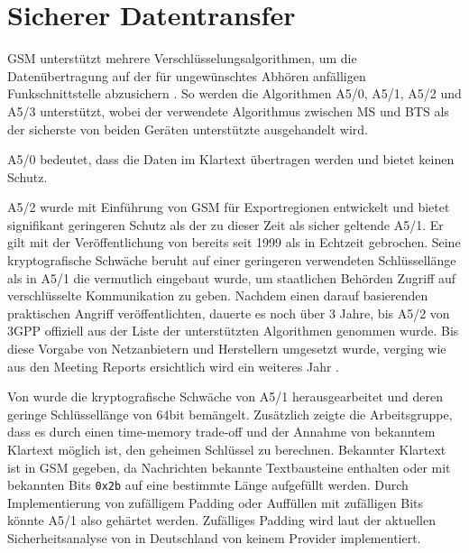 \section{Sicherer Datentransfer}

\ac{GSM} unterstützt mehrere Verschlüsselungsalgorithmen, um die Datenübertragung auf der für ungewünschtes Abhören anfälligen Funkschnittstelle abzusichern . So werden die Algorithmen A5/0, A5/1, A5/2 und A5/3 unterstützt, wobei der verwendete Algorithmus zwischen \ac{MS} und \ac{BTS} als der sicherste von beiden Geräten unterstützte ausgehandelt wird. 

A5/0 bedeutet, dass die Daten im Klartext übertragen werden und bietet keinen Schutz. 

A5/2 wurde mit Einführung von GSM für Exportregionen entwickelt und bietet signifikant geringeren Schutz als der zu dieser Zeit als sicher geltende A5/1. Er gilt mit der Veröffentlichung von \citet{goldberg1999real} bereits seit 1999 als in Echtzeit gebrochen. Seine kryptografische Schwäche beruht auf einer geringeren verwendeten Schlüssellänge als in A5/1 die vermutlich eingebaut wurde, um staatlichen Behörden Zugriff auf verschlüsselte Kommunikation zu geben. Nachdem \citet{barkan2003instant} einen darauf basierenden praktischen Angriff veröffentlichten, dauerte es noch über 3 Jahre, bis A5/2 von \ac{3GPP} offiziell aus der Liste der unterstützten Algorithmen genommen wurde. Bis diese Vorgabe von Netzanbietern und Herstellern umgesetzt wurde, verging wie aus den Meeting Reports ersichtlich wird ein weiteres Jahr \citep{osmocom:withdrawal-a52}.

Von \citet{golic1997cryptanalysis} wurde die kryptografische Schwäche von A5/1 herausgearbeitet und deren geringe Schlüssellänge von 64bit bemängelt. Zusätzlich zeigte die Arbeitsgruppe, dass es durch einen time-memory trade-off und der Annahme von bekanntem Klartext möglich ist, den geheimen Schlüssel zu berechnen. Bekannter Klartext ist in \ac{GSM} gegeben, da Nachrichten bekannte Textbausteine enthalten oder mit bekannten Bits \texttt{0x2b} auf eine bestimmte Länge aufgefüllt werden. Durch Implementierung von zufälligem Padding oder Auffüllen mit zufälligen Bits könnte A5/1 also gehärtet werden. Zufälliges Padding wird laut der aktuellen Sicherheitsanalyse von \citet{gsmmap:secrep-ger} in Deutschland von keinem Provider implementiert.

